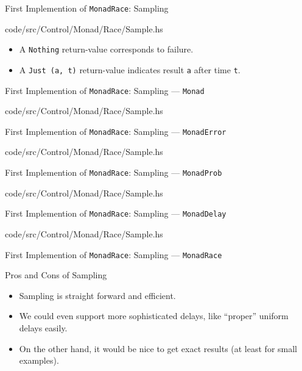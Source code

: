 ﻿\documentclass[aspectratio=169]{beamer}
\begin{document}
\begin{frame}{First Implemention of {\tt MonadRace}: Sampling}
    
        {code/src/Control/Monad/Race/Sample.hs}
    \begin{itemize}
        \item
            A {\tt Nothing} return-value corresponds to failure.
        \item
            A {\tt Just (a, t)} return-value indicates result {\tt a}
            after time {\tt t}.
    \end{itemize}
\end{frame}

\begin{frame}{First Implemention of {\tt MonadRace}: Sampling --- \tt Monad}
    
        {code/src/Control/Monad/Race/Sample.hs}
\end{frame}

\begin{frame}{First Implemention of {\tt MonadRace}: Sampling --- \tt MonadError}
    
        {code/src/Control/Monad/Race/Sample.hs}
\end{frame}

\begin{frame}{First Implemention of {\tt MonadRace}: Sampling --- \tt MonadProb}
    
        {code/src/Control/Monad/Race/Sample.hs}
\end{frame}

\begin{frame}{First Implemention of {\tt MonadRace}: Sampling --- \tt MonadDelay}
    
        {code/src/Control/Monad/Race/Sample.hs}
\end{frame}

\begin{frame}{First Implemention of {\tt MonadRace}: Sampling --- \tt MonadRace}
    \vspace{-5mm}
\end{frame}

\begin{frame}{Pros and Cons of Sampling}
    \begin{itemize}
        \item
            Sampling is straight forward and efficient.
        \item
            We could even support more sophisticated delays,
            like ``proper'' uniform delays easily.
        \item
            On the other hand, it would be nice to get \alert{exact} results
            (at least for small examples).
    \end{itemize}
\end{frame}
\end{document}
